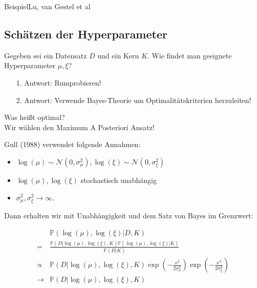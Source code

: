 \documentclass{beamer}
\begin{document}
{\begin{frame}{Beispiel}{Lu, van Gestel et al}
\end{frame}




\subsection{Schätzen der Hyperparameter}

\begin{frame}
	Gegeben sei ein Datensatz $D$ und ein Kern $K$. Wie findet man geeignete Hyperparameter $\mu, \xi$?
	\begin{itemize}
		\item[1.]Antwort: Rumprobieren!
		\item[2.]Antwort: Verwende Bayes-Theorie um Optimalitätskriterien herzuleiten!
	\end{itemize}
	Was heißt optimal?\\
	Wir wählen den Maximum A Posteriori Ansatz!
\end{frame}


\begin{frame}

Gull (1988) verwendet folgende Annahmen:

\begin{itemize}
	\item $\log(\mu) \sim \mathcal{N}(0, \sigma_\mu^2), \log(\xi) \sim \mathcal{N}(0, 				  \sigma_\xi^2)$ 
	\item $\log(\mu), \log(\xi)$ stochastisch unabhängig
	\item $\sigma_\mu^2, \sigma_\xi^2 \rightarrow \infty$.
\end{itemize}

Dann erhalten wir mit Unabhängigkeit und dem Satz von Bayes im Grenzwert:

\begin{align}
&\mathbb{P}(\log(\mu), \log(\xi)\vert D, K)\\
 =& \frac{\mathbb{P}(D\vert \log(\mu),\log(\xi),K)\mathbb{P}(\log(\mu), \log(\xi) \vert K)}{\mathbb{P}(D\vert K)}  \\
 \propto & \mathbb{P}(D\vert \log(\mu),\log(\xi),K)\exp(-\frac{x^2}{2\sigma_\mu^2})\exp(-\frac{x^2}{2\sigma_\xi^2})\\
\rightarrow & \mathbb{P}(D\vert \log(\mu),\log(\xi),K)
\end{align}

\end{frame}


}
\end{document}
